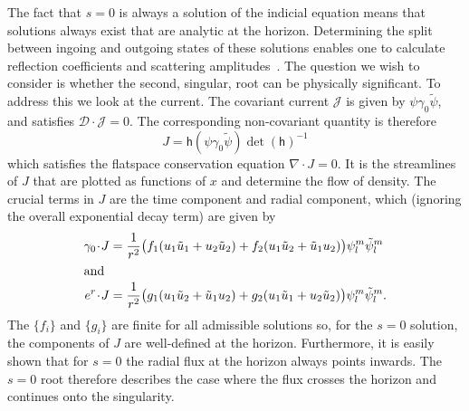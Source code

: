 \documentclass[a4paper]{article}
\numberwithin{equation}{section}
\newcommand{\dt}{\! \cdot \!}
\newcommand{\cld}{{\mathcal{D}}}
\newcommand{\clj}{{\mathcal{J}}}
\newcommand{\go}{\gamma_{0}}
\newcommand{\psirev}{\tilde{\psi}}
\newcommand{\lih}{\mathsf{h}}
\newcommand{\hu}{\lih}
\newcommand{\grad}{\nabla}
\newcommand{\dhi}{\det(\hu)^{-1}}
\newcommand{\urev}{\tilde{u}}
\begin{document}
The fact that $s=0$ is always a solution of the indicial equation
means that solutions always exist that are analytic at the horizon.
Determining the split between ingoing and outgoing states of these
solutions enables one to calculate reflection coefficients and
scattering amplitudes~\cite{gap}.  The question we wish to consider is
whether the second, singular, root can be physically significant.  To
address this we look at the current.  The covariant current $\clj$ is
given by $\psi\go\psirev$, and satisfies $\cld\dt\clj=0$.  The
corresponding non-covariant quantity is therefore
%
\begin{equation}
J = \hu(\psi\go\psirev) \dhi
\end{equation}
%
which satisfies the flatspace conservation equation $\grad\dt J=0$.
It is the streamlines of $J$ that are plotted as functions of $x$ and
determine the flow of density.  The crucial terms in $J$ are the time
component and radial component, which (ignoring the overall
exponential decay term) are given by
%
\begin{align}
\go\dt J &= \frac{1}{r^2} \bigl( f_1 (u_1 \urev_1 + u_2 \urev_2) + f_2
(u_1 \urev_2 + \urev_1 u_2 ) \bigr) \psi_l^m \psirev_l^m  \\
%
\intertext{and}
%
e^r \dt J &= \frac{1}{r^2} \bigl( g_1 (u_1 \urev_2 + \urev_1 u_2 ) +
g_2  (u_1 \urev_1 + u_2 \urev_2) \bigr) \psi_l^m \psirev_l^m. 
\end{align}
%
The $\{f_i\}$ and $\{g_i\}$ are finite for all admissible solutions
so, for the $s=0$ solution, the components of $J$ are well-defined at
the horizon.  Furthermore, it is easily shown that for $s=0$ the
radial flux at the horizon always points inwards.  The $s=0$ root
therefore describes the case where the flux crosses the horizon and
continues onto the singularity.
\end{document}
